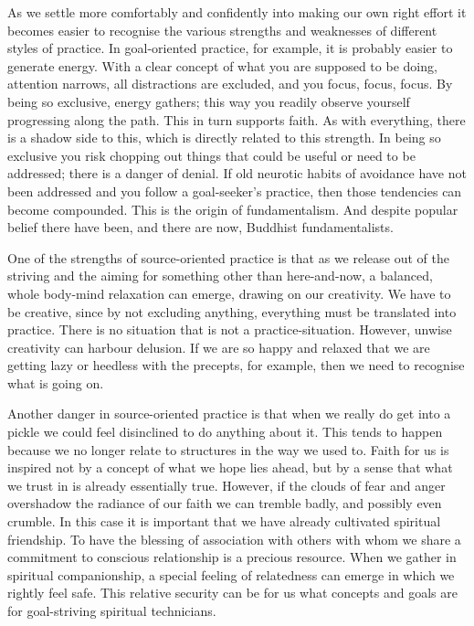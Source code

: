 As we settle more comfortably and confidently into making our own right
effort it becomes easier to recognise the various strengths and
weaknesses of different styles of practice. In goal-oriented practice,
for example, it is probably easier to generate energy. With a clear
concept of what you are supposed to be doing, attention narrows, all
distractions are excluded, and you focus, focus, focus. By being so
exclusive, energy gathers; this way you readily observe yourself
progressing along the path. This in turn supports faith. As with
everything, there is a shadow side to this, which is directly related to
this strength. In being so exclusive you risk chopping out things that
could be useful or need to be addressed; there is a danger of denial. If
old neurotic habits of avoidance have not been addressed and you follow
a goal-seeker's practice, then those tendencies can become compounded. This
is the origin of fundamentalism. And despite popular belief there have
been, and there are now, Buddhist fundamentalists.

One of the strengths of source-oriented practice is that as we release
out of the striving and the aiming for something other than
here-and-now, a balanced, whole body-mind relaxation can emerge,
drawing on our creativity.
We have to be creative, since by not excluding
anything, everything must be translated into practice. There is no
situation that is not a practice-situation. However, unwise creativity
can harbour delusion. If we are so happy and relaxed that we are getting
lazy or heedless with the precepts, for example, then we need to
recognise what is going on.

Another danger in source-oriented practice is that when we really do get
into a pickle we could feel disinclined to do anything about it. This
tends to happen because we no longer relate to structures in the way we
used to. Faith for us is inspired not by a concept of what we hope lies
ahead, but by a sense that what we trust in is already essentially true.
However, if the clouds of fear and anger overshadow the radiance of our
faith we can tremble badly, and possibly even crumble. In this case it
is important that we have already cultivated spiritual friendship. To
have the blessing of association with others with whom we share a
commitment to conscious relationship is a precious resource. When we
gather in spiritual companionship, a special feeling of relatedness can
emerge in which we rightly feel safe. This relative security can be for
us what concepts and goals are for goal-striving spiritual technicians.


